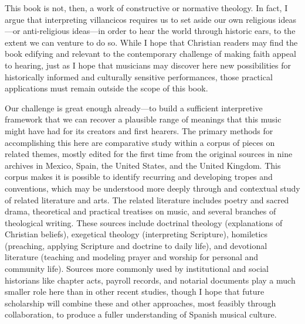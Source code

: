 This book is not, then, a work of constructive or normative theology.
In fact, I argue that interpreting villancicos requires us to set aside our own
religious ideas---or anti-religious ideas---in order to hear the world through
historic ears, to the extent we can venture to do so.%
While I hope that Christian readers may find the book edifying and relevant to
the contemporary challenge of making faith appeal to hearing, just as I hope
that musicians may discover here new possibilities for historically informed
and culturally sensitive performances, those practical applications must
remain outside the scope of this book.

Our challenge is great enough already---to build a sufficient interpretive
framework that we can recover a plausible range of meanings that this music
might have had for its creators and first hearers.
The primary methods for accomplishing this here are comparative study within a
corpus of pieces on related themes, mostly edited for the first time from the
original sources in nine archives in Mexico, Spain, the United States, and the
United Kingdom.
This corpus makes it is possible to identify recurring and developing tropes
and conventions, which may be understood more deeply through and contextual
study of related literature and arts.
The related literature includes poetry and sacred drama, theoretical and
practical treatises on music, and several branches of theological writing.
These sources include doctrinal theology (explanations of Christian beliefs),
exegetical theology (interpreting Scripture), homiletics (preaching, applying
Scripture and doctrine to daily life), and devotional literature (teaching and
modeling prayer and worship for personal and community life).
Sources more commonly used by institutional and social historians like chapter
acts, payroll records, and notarial documents play a much smaller role here
than in other recent studies, though I hope that future scholarship will
combine these and other approaches, most feasibly through collaboration, to
produce a fuller understanding of Spanish musical culture.

